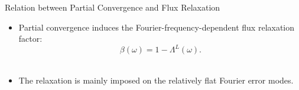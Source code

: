 \begin{frame}{Relation between Partial Convergence and Flux Relaxation}
\begin{figure}
\begin{subfigure}[t]{0.45\textwidth}
	\end{subfigure}
\end{figure} 
\vspace{-1.5em}
\begin{itemize}
    \item Partial convergence induces the Fourier-frequency-dependent flux relaxation factor:
    \vspace{-0.5em}
    \begin{equation}\label{eq:betad}
        \beta(\omega)=1-\Lambda^L(\omega).
    \end{equation}\\
    \vspace{-1.2em}
    \item The relaxation is mainly imposed on the relatively flat Fourier error modes.
\end{itemize}
\end{frame}
